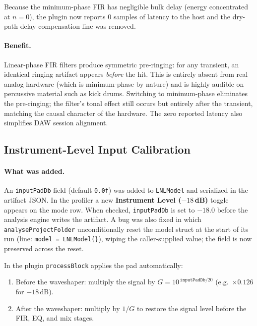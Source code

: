 \documentclass[11pt, letterpaper]{article}
\begin{document}
Because the minimum-phase FIR has negligible bulk delay (energy concentrated
at $n = 0$), the plugin now reports 0 samples of latency to the host and
the dry-path delay compensation line was removed.

\paragraph{Benefit.}
Linear-phase FIR filters produce symmetric pre-ringing: for any transient, an
identical ringing artifact appears \emph{before} the hit.  This is entirely
absent from real analog hardware (which is minimum-phase by nature) and is
highly audible on percussive material such as kick drums.  Switching to
minimum-phase eliminates the pre-ringing; the filter's tonal effect still
occurs but entirely after the transient, matching the causal character of the
hardware.  The zero reported latency also simplifies DAW session alignment.

\subsection{Instrument-Level Input Calibration}

\paragraph{What was added.}
An \texttt{inputPadDb} field (default \texttt{0.0f}) was added to
\texttt{LNLModel} and serialized in the artifact JSON.  In the profiler a new
\textbf{Instrument Level ($-18$\,dB)} toggle appears on the mode row.  When
checked, \texttt{inputPadDb} is set to $-18.0$ before the analysis engine
writes the artifact.  A bug was also fixed in which
\texttt{analyseProjectFolder} unconditionally reset the model struct at the
start of its run (line: \texttt{model = LNLModel\{\}}), wiping the
caller-supplied value; the field is now preserved across the reset.

In the plugin \texttt{processBlock} applies the pad automatically:

\begin{enumerate}[leftmargin=1.5em]
    \item Before the waveshaper: multiply the signal by
          $G = 10^{\,\texttt{inputPadDb}/20}$ (e.g.\ $\times 0.126$ for
          $-18$\,dB).
    \item After the waveshaper: multiply by $1/G$ to restore the signal level
          before the FIR, EQ, and mix stages.
\end{enumerate}
\end{document}
